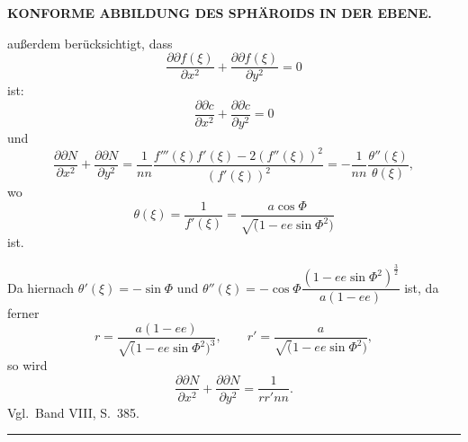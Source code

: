 \par\clearpage
\noindent\null\hfill{\small\textbf{KONFORME ABBILDUNG DES SPHÄROIDS IN DER EBENE.}}\hfill{}\par\medskip

{\small
\noindent außerdem berücksichtigt, dass
\[
\frac{\partial\partial f(\xi)}{\partial x^2}
+\frac{\partial\partial f(\xi)}{\partial y^2}=0
\]
\noindent ist:
\begin{equation*}
\frac{\partial\partial c}{\partial x^2}
+\frac{\partial\partial c}{\partial y^2}=0
\tag*{6)}
\end{equation*}
\noindent und
\begin{equation*}
\frac{\partial\partial N}{\partial x^2}
+\frac{\partial\partial N}{\partial y^2}
=\frac1{nn}\frac{f'''(\xi)f'(\xi)-2(f''(\xi))^2}{(f'(\xi))^2}
=-\frac1{nn}\frac{\theta''(\xi)}{\theta(\xi)},
\tag*{7)}
\end{equation*}
\noindent wo
\[
\theta(\xi)=\frac1{f'(\xi)}=\frac{a\cos\Phi}{\surd(1-ee\sin\Phi^2)}
\]
\noindent ist.

Da hiernach \(\theta'(\xi)=-\sin\Phi\) und
\(\theta''(\xi)=-\cos\Phi\dfrac{(1-ee\sin\Phi^2)^{\frac32}}{a(1-ee)}\) ist, da ferner
\[
r=\frac{a(1-ee)}{\surd(1-ee\sin\Phi^2)^3},\qquad
r'=\frac{a}{\surd(1-ee\sin\Phi^2)},
\]
\noindent so wird
\begin{equation*}
\frac{\partial\partial N}{\partial x^2}
+\frac{\partial\partial N}{\partial y^2}=\frac1{rr'nn}.
\tag*{8)}
\end{equation*}
\noindent Vgl.\ Band VIII, S.\ 385.
\begin{center}\rule{.24\linewidth}{.4pt}\end{center}

}
